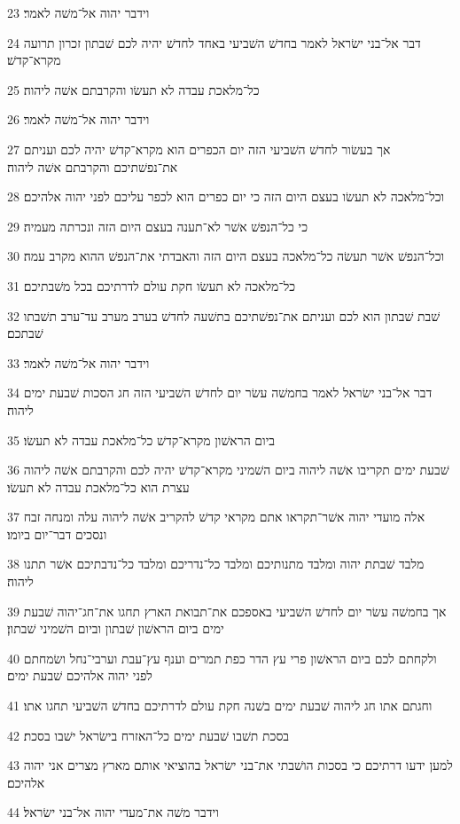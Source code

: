 \par 23 וידבר יהוה אל־משׁה לאמר׃
\par 24 דבר אל־בני ישׂראל לאמר בחדשׁ השׁביעי באחד לחדשׁ יהיה לכם שׁבתון זכרון תרועה מקרא־קדשׁ׃
\par 25 כל־מלאכת עבדה לא תעשׂו והקרבתם אשׁה ליהוה׃
\par 26 וידבר יהוה אל־משׁה לאמר׃
\par 27 אך בעשׂור לחדשׁ השׁביעי הזה יום הכפרים הוא מקרא־קדשׁ יהיה לכם ועניתם את־נפשׁתיכם והקרבתם אשׁה ליהוה׃
\par 28 וכל־מלאכה לא תעשׂו בעצם היום הזה כי יום כפרים הוא לכפר עליכם לפני יהוה אלהיכם׃
\par 29 כי כל־הנפשׁ אשׁר לא־תענה בעצם היום הזה ונכרתה מעמיה׃
\par 30 וכל־הנפשׁ אשׁר תעשׂה כל־מלאכה בעצם היום הזה והאבדתי את־הנפשׁ ההוא מקרב עמה׃
\par 31 כל־מלאכה לא תעשׂו חקת עולם לדרתיכם בכל משׁבתיכם׃
\par 32 שׁבת שׁבתון הוא לכם ועניתם את־נפשׁתיכם בתשׁעה לחדשׁ בערב מערב עד־ערב תשׁבתו שׁבתכם׃
\par 33 וידבר יהוה אל־משׁה לאמר׃
\par 34 דבר אל־בני ישׂראל לאמר בחמשׁה עשׂר יום לחדשׁ השׁביעי הזה חג הסכות שׁבעת ימים ליהוה׃
\par 35 ביום הראשׁון מקרא־קדשׁ כל־מלאכת עבדה לא תעשׂו׃
\par 36 שׁבעת ימים תקריבו אשׁה ליהוה ביום השׁמיני מקרא־קדשׁ יהיה לכם והקרבתם אשׁה ליהוה עצרת הוא כל־מלאכת עבדה לא תעשׂו׃
\par 37 אלה מועדי יהוה אשׁר־תקראו אתם מקראי קדשׁ להקריב אשׁה ליהוה עלה ומנחה זבח ונסכים דבר־יום ביומו׃
\par 38 מלבד שׁבתת יהוה ומלבד מתנותיכם ומלבד כל־נדריכם ומלבד כל־נדבתיכם אשׁר תתנו ליהוה׃
\par 39 אך בחמשׁה עשׂר יום לחדשׁ השׁביעי באספכם את־תבואת הארץ תחגו את־חג־יהוה שׁבעת ימים ביום הראשׁון שׁבתון וביום השׁמיני שׁבתון׃
\par 40 ולקחתם לכם ביום הראשׁון פרי עץ הדר כפת תמרים וענף עץ־עבת וערבי־נחל ושׂמחתם לפני יהוה אלהיכם שׁבעת ימים׃
\par 41 וחגתם אתו חג ליהוה שׁבעת ימים בשׁנה חקת עולם לדרתיכם בחדשׁ השׁביעי תחגו אתו׃
\par 42 בסכת תשׁבו שׁבעת ימים כל־האזרח בישׂראל ישׁבו בסכת׃
\par 43 למען ידעו דרתיכם כי בסכות הושׁבתי את־בני ישׂראל בהוציאי אותם מארץ מצרים אני יהוה אלהיכם׃
\par 44 וידבר משׁה את־מעדי יהוה אל־בני ישׂראל׃

